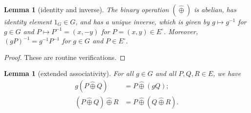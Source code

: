 \documentclass[12pt]{article}
\newtheorem{lemma}[theorem]{Lemma}
\newcommand{\Eoo}{E^{\circ}}
\newcommand{\hplus}{\hat\oplus}
\newcommand{\Go}{\langle\rho\rangle}
\begin{document}
\begin{lemma}[identity and inverse]\label{lemma:inv2} 
The binary operation $(\hplus)$ is abelian, has identity
  element $1_G\in G$, and has a unique inverse, which
   is given by $g\mapsto g^{-1}$ for $g\in G$
  and $P\mapsto P^{-1} = (x,-y)$ for $P=(x,y)\in \Eoo$.  Moreover, $(g
  P)^{-1} = g^{-1} P^{-1}$ for $g\in G$ and $P\in \Eoo$.
\end{lemma}

\begin{proof} These are routine verifications.
\end{proof}


\begin{lemma}[extended associativity]\label{lemma:pseudo} 
  For all $g\in G$ and all $P,Q,R\in E$, we have
\begin{align}
g (P\hplus Q) &= P\hplus (g Q);\\
(P\hplus Q)\hplus R &= P \hplus (Q\hplus R).
\end{align}
\end{lemma}
\end{document}

